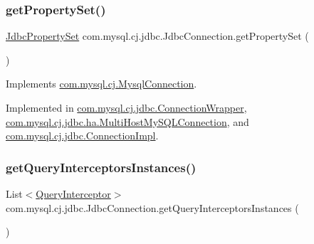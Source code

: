\subsubsection{\texorpdfstring{get\+Property\+Set()}{getPropertySet()}}
{\footnotesize\ttfamily \mbox{\hyperlink{interfacecom_1_1mysql_1_1cj_1_1jdbc_1_1_jdbc_property_set}{Jdbc\+Property\+Set}} com.\+mysql.\+cj.\+jdbc.\+Jdbc\+Connection.\+get\+Property\+Set (\begin{DoxyParamCaption}{ }\end{DoxyParamCaption})}



Implements \mbox{\hyperlink{interfacecom_1_1mysql_1_1cj_1_1_mysql_connection_a51fb6a3db410136a80cda075db6a70f5}{com.\+mysql.\+cj.\+Mysql\+Connection}}.



Implemented in \mbox{\hyperlink{classcom_1_1mysql_1_1cj_1_1jdbc_1_1_connection_wrapper_a32dc1cdc24960317f3b65009ae5bb475}{com.\+mysql.\+cj.\+jdbc.\+Connection\+Wrapper}}, \mbox{\hyperlink{classcom_1_1mysql_1_1cj_1_1jdbc_1_1ha_1_1_multi_host_my_s_q_l_connection_adc1a5c59c115064dc892d458337dd638}{com.\+mysql.\+cj.\+jdbc.\+ha.\+Multi\+Host\+My\+S\+Q\+L\+Connection}}, and \mbox{\hyperlink{classcom_1_1mysql_1_1cj_1_1jdbc_1_1_connection_impl_a46dbc5cd68d7e3bd2ba1931c4bd5f003}{com.\+mysql.\+cj.\+jdbc.\+Connection\+Impl}}.

\mbox{\label{interfacecom_1_1mysql_1_1cj_1_1jdbc_1_1_jdbc_connection_a06e9e0a4a916223a7b1582f10b8fdb5d}} 
\subsubsection{\texorpdfstring{get\+Query\+Interceptors\+Instances()}{getQueryInterceptorsInstances()}}
{\footnotesize\ttfamily List$<$\mbox{\hyperlink{interfacecom_1_1mysql_1_1cj_1_1interceptors_1_1_query_interceptor}{Query\+Interceptor}}$>$ com.\+mysql.\+cj.\+jdbc.\+Jdbc\+Connection.\+get\+Query\+Interceptors\+Instances (\begin{DoxyParamCaption}{ }\end{DoxyParamCaption})}



